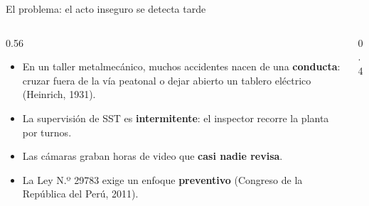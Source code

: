 \documentclass[aspectratio=169,11pt]{beamer}
\begin{document}
\begin{frame}{El problema: el acto inseguro se detecta tarde}
\begin{columns}[T]
\begin{column}{0.56\textwidth}
\begin{itemize}\setlength{\itemsep}{8pt}
  \item En un taller metalmecánico, muchos accidentes nacen de una \textbf{conducta}: cruzar fuera de la vía peatonal o dejar abierto un tablero eléctrico (Heinrich, 1931).
  \item La supervisión de SST es \textbf{intermitente}: el inspector recorre la planta por turnos.
  \item Las cámaras graban horas de video que \textbf{casi nadie revisa}.
  \item La Ley N.º 29783 exige un enfoque \textbf{preventivo} (Congreso de la República del Perú, 2011).
\end{itemize}
\end{column}
\begin{column}{0.4\textwidth}
\end{column}
\end{columns}
\end{frame}
\end{document}

